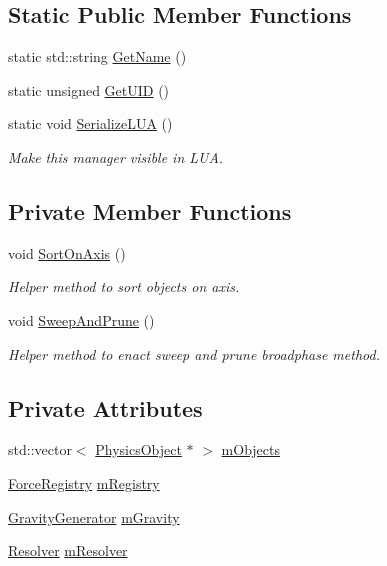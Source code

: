 \subsection*{Static Public Member Functions}
\begin{DoxyCompactItemize}
\item 
static std\+::string \hyperlink{classPhysicsWorld_ad8e22d79e5c497532398f3105a8e282b}{Get\+Name} ()
\item 
static unsigned \hyperlink{classPhysicsWorld_ac164056a7f501bb5bbe9fd2af9219d3e}{Get\+U\+ID} ()
\item 
static void \hyperlink{classPhysicsWorld_a001da62cbab0d0f86e9cdfa9203dcf95}{Serialize\+L\+UA} ()
\begin{DoxyCompactList}\small\item\em Make this manager visible in L\+UA. \end{DoxyCompactList}\end{DoxyCompactItemize}
\subsection*{Private Member Functions}
\begin{DoxyCompactItemize}
\item 
void \hyperlink{classPhysicsWorld_ab35218ebc1aa5a92433a3f0d36220104}{Sort\+On\+Axis} ()
\begin{DoxyCompactList}\small\item\em Helper method to sort objects on axis. \end{DoxyCompactList}\item 
void \hyperlink{classPhysicsWorld_aa8f2d8b3feed23d90b81cb2993e26ddf}{Sweep\+And\+Prune} ()
\begin{DoxyCompactList}\small\item\em Helper method to enact sweep and prune broadphase method. \end{DoxyCompactList}\end{DoxyCompactItemize}
\subsection*{Private Attributes}
\begin{DoxyCompactItemize}
\item 
std\+::vector$<$ \hyperlink{classPhysicsObject}{Physics\+Object} $\ast$ $>$ \hyperlink{classPhysicsWorld_a02dd8c3fe190a2da79a84d5b284f2765}{m\+Objects}
\item 
\hyperlink{classForceRegistry}{Force\+Registry} \hyperlink{classPhysicsWorld_ab40b28469589a03eaf2a98c9fc2b66ed}{m\+Registry}
\item 
\hyperlink{classGravityGenerator}{Gravity\+Generator} \hyperlink{classPhysicsWorld_a39c48d32a5426bbbbfa3a7e08c01b053}{m\+Gravity}
\item 
\hyperlink{classResolver}{Resolver} \hyperlink{classPhysicsWorld_a4552553bfba7d42255493b036893c0c5}{m\+Resolver}
\end{DoxyCompactItemize}
